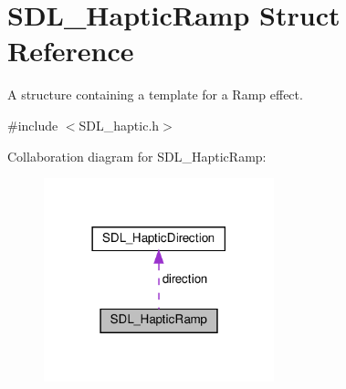 \hypertarget{structSDL__HapticRamp}{}\section{S\+D\+L\+\_\+\+Haptic\+Ramp Struct Reference}
\label{structSDL__HapticRamp}


A structure containing a template for a Ramp effect.  




{\ttfamily \#include $<$S\+D\+L\+\_\+haptic.\+h$>$}



Collaboration diagram for S\+D\+L\+\_\+\+Haptic\+Ramp\+:\nopagebreak
\begin{figure}[H]
\begin{center}
\leavevmode
\includegraphics[width=189pt]{structSDL__HapticRamp__coll__graph}
\end{center}
\end{figure}
